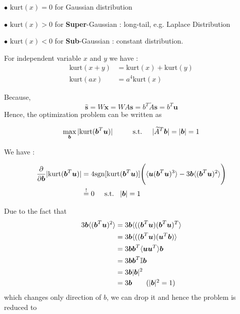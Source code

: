 $\bullet$ $\text{kurt}(x) = 0$  for Gaussian distribution

$\bullet$ $\text{kurt}(x) > 0$ for \textbf{Super}-Gaussian : long-tail, e.g. Laplace Distribution

$\bullet$ $\text{kurt}(x) < 0$ for \textbf{Sub}-Gaussian : constant distribution.


For independent variable $x$ and $y$ we have :
\begin{align*}
	\text{kurt}(x+y)  &= \text{kurt}(x) + \text{kurt}(y) \\
	\text{kurt}(ax) &= a^4\text{kurt}(x)
\end{align*}

Because, 
$$
\boldsymbol{\hat{s}} = W\boldsymbol{x} = W A \boldsymbol{s}   =  b^T \widetilde{A} \boldsymbol{s} = b^T\boldsymbol{u}
$$
Hence, the optimization problem can be written as 

$$
\max_{\boldsymbol{b}}  | \text{kurt}( \boldsymbol{b}^T \boldsymbol{u}  ) | \hspace{1cm} \text{s.t.} \hspace{0.5cm} | \widetilde{A}^T \boldsymbol{b}| = |\boldsymbol{b}|= 1
$$

We have : 

\begin{align*}
	\frac{\partial}{ \partial \boldsymbol{b}} |\text{kurt}(\boldsymbol{b}^T \boldsymbol{u}) | &= 4\text{sgn}[ \text{kurt}(\boldsymbol{b}^T\boldsymbol{u}) ] \Bigg( \langle \boldsymbol{u}(\boldsymbol{b}^T \boldsymbol{u})^3 \rangle - 3\boldsymbol{b}\langle (\boldsymbol{b}^T \boldsymbol{u})^2 \rangle \Bigg) \\
	&\stackrel{!}{=} 0 \hspace{0.5cm} \text{s.t.} \hspace{0.3cm} |\boldsymbol{b}| = 1
\end{align*}

Due to the fact that 
\begin{align*}
	3\boldsymbol{b}\langle(\boldsymbol{b}^T\boldsymbol{u})^2\rangle &= 3\boldsymbol{b}\langle 
	( (\boldsymbol{b}^T \boldsymbol{u})(\boldsymbol{b}^T \boldsymbol{u})^T
	\rangle \\
	&= 3\boldsymbol{b}\langle 
	( (\boldsymbol{b}^T \boldsymbol{u})(\boldsymbol{u}^T \boldsymbol{b})
	\rangle \\
	&= 3\boldsymbol{b} \boldsymbol{b}^T \langle \boldsymbol{u} \boldsymbol{u}^T \rangle \boldsymbol{b} \\
	&= 3 \boldsymbol{b} \boldsymbol{b}^T \mathbb{I} \boldsymbol{b} \\
	&= 3 \boldsymbol{b} |\boldsymbol{b}|^2 \\
	&= 3 \boldsymbol{b}  \tag*{($|\boldsymbol{b}|^2 = 1 $)}
\end{align*}
which changes only direction of $b$, we can drop it and hence the problem is reduced to 

